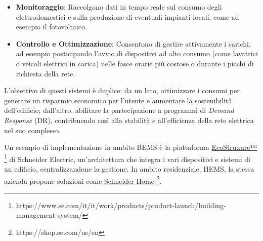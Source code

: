 \begin{itemize}
    \item \textbf{Monitoraggio}: Raccolgono dati in tempo reale sul consumo degli elettrodomestici e sulla produzione di eventuali impianti locali, come ad esempio il fotovoltaico.
    \item \textbf{Controllo e Ottimizzazione}: Consentono di gestire attivamente i carichi, ad esempio posticipando l'avvio di dispositivi ad alto consumo (come lavatrici o veicoli elettrici in carica) nelle fasce orarie più costose o durante i picchi di richiesta della rete.
\end{itemize}


L'obiettivo di questi sistemi è duplice: da un lato, ottimizzare i consumi per generare un risparmio economico per l'utente e aumentare la sostenibilità dell'edificio; dall'altro, abilitare la partecipazione a programmi di \textit{Demand Response} (DR), contribuendo così alla stabilità e all'efficienza della rete elettrica nel suo complesso.





Un esempio di implementazione in ambito BEMS è la piattaforma \href{https://www.se.com/it/it/work/products/product-launch/building-management-system/}{EcoStruxure™} \footnote{https://www.se.com/it/it/work/products/product-launch/building-management-system/} di Schneider Electric, un'architettura che integra i vari dispositivi e sistemi di un edificio, centralizzandone la gestione. In ambito residenziale, HEMS, la stessa azienda propone soluzioni come \href{https://shop.se.com/us/en}{Schneider Home} \footnote{https://shop.se.com/us/en}.



